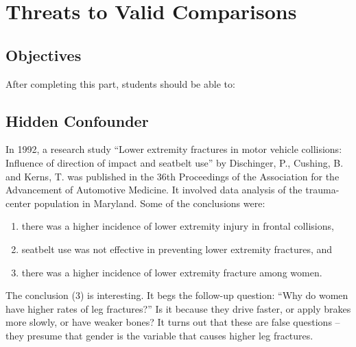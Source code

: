 \documentclass[11pt, chapterprefix=true]{scrbook}\usepackage[]{graphicx}\usepackage[]{color}
\begin{document}

\chapter{Threats to Valid Comparisons}
\label{chap:ch4}

\section{Objectives}

After completing this part, students should be able to:


\section{Hidden Confounder}  

In 1992, a research study ``Lower extremity fractures in motor vehicle collisions:
Influence of direction of impact and seatbelt use'' by Dischinger, P., Cushing, B. and Kerns, T. was published in the 36th Proceedings of the Association for the Advancement of Automotive Medicine.  It involved data analysis of the trauma-center population in Maryland.  Some of the conclusions were:

\begin{enumerate}
   \item there was a higher incidence of lower extremity injury in frontal collisions,
   \item seatbelt use was not effective in preventing lower extremity fractures, and
   \item there was a higher incidence of lower extremity fracture among women.
\end{enumerate}

The conclusion (3) is interesting.  It begs the follow-up question: ``Why do women have higher rates of leg fractures?''  Is it because they drive faster, or apply brakes more slowly, or have weaker bones?  It turns out that these are false questions -- they presume that gender is the variable that causes higher leg fractures.  
\end{document}
